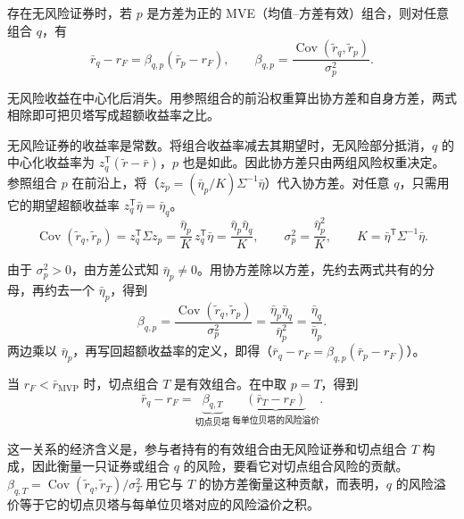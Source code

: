 \begin{tcolorbox}[knowledge]
 存在无风险证券时，若 $p$ 是方差为正的 MVE（均值--方差有效）组合，则对任意组合 $q$，有
\begin{equation}
 \bar r_q-r_F=\beta_{q,p}(\bar r_p-r_F),\qquad
 \beta_{q,p}=\frac{\operatorname{Cov}(\widetilde r_q,\widetilde r_p)}{\sigma_p^2}.
 \label{eq:wj-12-9}
\end{equation}
\end{tcolorbox}

无风险收益在中心化后消失。用参照组合的前沿权重算出协方差和自身方差，两式相除即可把贝塔写成超额收益率之比。

\begin{solution}[label-content={证明},blank-type=none]
无风险证券的收益率是常数。将组合收益率减去其期望时，无风险部分抵消，$q$ 的中心化收益率为 $z_q^{\mathsf T}(\widetilde r-\bar r)$，$p$ 也是如此。因此协方差只由两组风险权重决定。参照组合 $p$ 在前沿上，将（$z_p=(\bar\eta_p/K)\Sigma^{-1}\bar\eta$）代入协方差。对任意 $q$，只需用它的期望超额收益率 $z_q^{\mathsf T}\bar\eta=\bar\eta_q$。
\[
 \operatorname{Cov}(\widetilde r_q,\widetilde r_p)
 =z_q^{\mathsf T}\Sigma z_p
 =\frac{\bar\eta_p}{K}\,z_q^{\mathsf T}\bar\eta
 =\frac{\bar\eta_p\bar\eta_q}{K},\qquad
 \sigma_p^2=\frac{\bar\eta_p^2}{K},\qquad
 K=\bar\eta^{\mathsf T}\Sigma^{-1}\bar\eta.
\]

由于 $\sigma_p^2>0$，由方差公式知 $\bar\eta_p\ne0$。用协方差除以方差，先约去两式共有的分母，再约去一个 $\bar\eta_p$，得到
\[
 \beta_{q,p}
 =\frac{\operatorname{Cov}(\widetilde r_q,\widetilde r_p)}{\sigma_p^2}
 =\frac{\bar\eta_p\bar\eta_q}{\bar\eta_p^2}
 =\frac{\bar\eta_q}{\bar\eta_p}.
\]
两边乘以 $\bar\eta_p$，再写回超额收益率的定义，即得（$\bar r_q-r_F=\beta_{q,p}(\bar r_p-r_F)$）。
\end{solution}

当 $r_F<\bar r_{\mathrm{MVP}}$ 时，切点组合 $T$ 是有效组合。在中取 $p=T$，得到
\begin{equation}
 \bar r_q-r_F
 =\underbrace{\beta_{q,T}}_{\text{切点贝塔}}\,
  \underbrace{(\bar r_T-r_F)}_{\text{每单位贝塔的风险溢价}}.
 \label{eq:wj-12-10}
\end{equation}

这一关系的经济含义是，参与者持有的有效组合由无风险证券和切点组合 $T$ 构成，因此衡量一只证券或组合 $q$ 的风险，要看它对切点组合风险的贡献。$\beta_{q,T}=\operatorname{Cov}(\widetilde r_q,\widetilde r_T)/\sigma_T^2$ 用它与 $T$ 的协方差衡量这种贡献，而表明，$q$ 的风险溢价等于它的切点贝塔与每单位贝塔对应的风险溢价之积。


